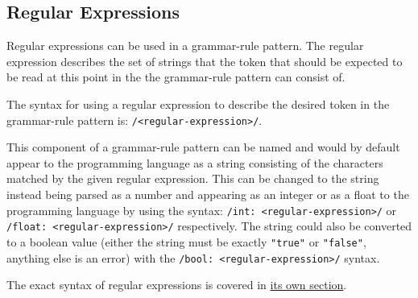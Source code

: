 
\subsection{Regular Expressions}
{
	Regular expressions can be used in a grammar-rule pattern.
	The regular expression describes the set of strings that the token
	that should be
	expected
	to be read at this point in the the grammar-rule pattern can consist of.
	
	The syntax for using a regular expression to describe the desired token
	in the grammar-rule pattern is: \texttt{/<regular-expression>/}.
	
	This component of a grammar-rule pattern can be named and would by default
	appear to
	the programming language as a string consisting of the characters matched
	by the given regular expression. This can be changed to the string
	instead being
	parsed as a number and appearing
	as an integer or as a float to the programming language
	by using the syntax:
	\texttt{/int: <regular-expression>/} or
	\texttt{/float: <regular-expression>/} respectively.
	The string could also be converted to a boolean value (either the string must
	be exactly \texttt{"true"} or \texttt{"false"}, anything else is an error)
	with the \texttt{/bool: <regular-expression>/} syntax.
	
	The exact syntax of regular expressions is covered in
	\hyperref[sec:regex]{its own section}.
	
}

